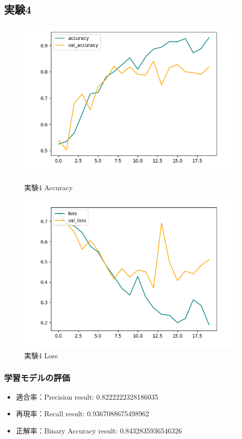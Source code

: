 \documentclass[a4paper, 11pt, titlepage]{jsarticle}
\begin{document}
\subsection{実験4}
\begin{figure}[htbp]
  \begin{minipage}[b]{0.45\linewidth}
    \centering
    \includegraphics[keepaspectratio, scale=0.435]{ex4_acc.png}
    \caption{実験4 Accuracy}
  \end{minipage}
  \begin{minipage}[b]{0.45\linewidth}
    \centering
    \includegraphics[keepaspectratio, scale=0.435]{ex4_loss.png}
    \caption{実験4 Loss}
  \end{minipage}
\end{figure}

\subsubsection{学習モデルの評価}
\begin{itemize}
\item 適合率：Precision result: 0.8222222328186035
\item 再現率：Recall result: 0.9367088675498962
\item 正解率：Binary Accuracy result: 0.8432835936546326
\end{itemize}
\end{document}
